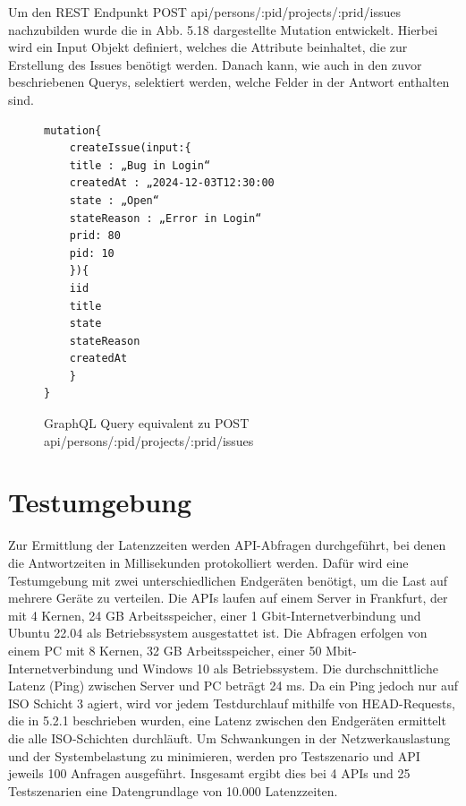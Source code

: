 \noindent
Um den REST Endpunkt \colorbox{gray!20}{POST api/persons/:pid/projects/:prid/issues} nachzubilden wurde die in Abb. 5.18 dargestellte Mutation entwickelt. Hierbei wird ein Input Objekt definiert, welches die Attribute beinhaltet, die zur Erstellung des Issues benötigt werden. Danach kann, wie auch in den zuvor beschriebenen Querys, selektiert werden, welche Felder in der Antwort enthalten sind.
\begin{figure}[H]
\begin{center}
\begin{BVerbatim}
mutation{
    createIssue(input:{
	title : „Bug in Login“
	createdAt : „2024-12-03T12:30:00
	state : „Open“
	stateReason : „Error in Login“
	prid: 80
	pid: 10
	}){
	iid
	title
	state
	stateReason
	createdAt
    }
}
\end{BVerbatim}
\end{center}
\caption{GraphQL Query equivalent zu POST api/persons/:pid/projects/:prid/issues}
\end{figure}

\label{sec:graphql}

\section{Testumgebung} %
\label{sec:testumgebung}
Zur Ermittlung der Latenzzeiten werden API-Abfragen durchgeführt, bei denen die Antwortzeiten in Millisekunden protokolliert werden. Dafür wird eine Testumgebung mit zwei unterschiedlichen Endgeräten benötigt, um die Last auf mehrere Geräte zu verteilen. Die APIs laufen auf einem Server in Frankfurt, der mit 4 Kernen, 24 GB Arbeitsspeicher, einer 1 Gbit-Internetverbindung und Ubuntu 22.04 als Betriebssystem ausgestattet ist.
\newline
Die Abfragen erfolgen von einem PC mit 8 Kernen, 32 GB Arbeitsspeicher, einer 50 Mbit-Internetverbindung und Windows 10 als Betriebssystem. Die durchschnittliche Latenz (Ping) zwischen Server und PC beträgt 24 ms. Da ein Ping jedoch nur auf ISO Schicht 3 agiert, wird vor jedem Testdurchlauf mithilfe von HEAD-Requests, die in 5.2.1 beschrieben wurden, eine Latenz zwischen den Endgeräten ermittelt die alle ISO-Schichten durchläuft. Um Schwankungen in der Netzwerkauslastung und der Systembelastung zu minimieren, werden pro Testszenario und API jeweils 100 Anfragen ausgeführt. Insgesamt ergibt dies bei 4 APIs und 25 Testszenarien eine Datengrundlage von 10.000 Latenzzeiten.




